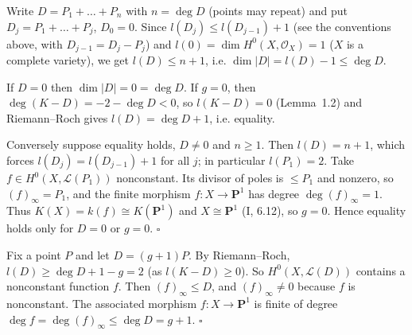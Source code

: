\documentclass[11pt]{article}
\begin{document}
\pf
Write $D=P_1+\dots+P_n$ with $n=\deg D$ (points may repeat) and put $D_j=P_1+\dots+P_j$, $D_0=0$. Since $l(D_j)\le l(D_{j-1})+1$ (see the conventions above, with $D_{j-1}=D_j-P_j$) and $l(0)=\dim H^0(X,\mathcal O_X)=1$ ($X$ is a complete variety), we get $l(D)\le n+1$, i.e. $\dim|D|=l(D)-1\le\deg D$.

If $D=0$ then $\dim|D|=0=\deg D$. If $g=0$, then $\deg(K-D)=-2-\deg D<0$, so $l(K-D)=0$ (Lemma~1.2) and Riemann--Roch gives $l(D)=\deg D+1$, i.e. equality.

Conversely suppose equality holds, $D\ne0$ and $n\ge1$. Then $l(D)=n+1$, which forces $l(D_j)=l(D_{j-1})+1$ for all $j$; in particular $l(P_1)=2$. Take $f\in H^0(X,\mathcal L(P_1))$ nonconstant. Its divisor of poles is $\le P_1$ and nonzero, so $(f)_\infty=P_1$, and the finite morphism $f:X\to\mathbf P^1$ has degree $\deg(f)_\infty=1$. Thus $K(X)=k(f)\cong K(\mathbf P^1)$ and $X\cong\mathbf P^1$ (I, 6.12), so $g=0$. Hence equality holds only for $D=0$ or $g=0$. \hfill$\square$

\pf
Fix a point $P$ and let $D=(g+1)P$. By Riemann--Roch, $l(D)\ge\deg D+1-g=2$ (as $l(K-D)\ge0$). So $H^0(X,\mathcal L(D))$ contains a nonconstant function $f$. Then $(f)_\infty\le D$, and $(f)_\infty\ne0$ because $f$ is nonconstant. The associated morphism $f:X\to\mathbf P^1$ is finite of degree $\deg f=\deg(f)_\infty\le\deg D=g+1$. \hfill$\square$
\end{document}
